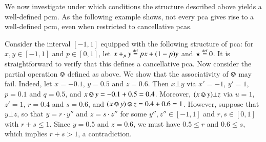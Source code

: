 We now investigate under which conditions the structure described above yields a well-defined pcm. As the following example shows, not every pca gives rise to a well-defined pcm, even when restricted to cancellative pcas.
\begin{example}
   Consider the interval $[-1,1]$ equipped with the following structure of pca: for $x,y\in [-1,1]$ and $p\in [0,1]$, let $x+_p y \stackrel{\text{\tiny def}}{=} p x + (1-p) y$ and $\star \stackrel{\text{\tiny def}}{=} 0$. It is straightforward to verify that this defines a cancellative pca. Now consider the partial operation $\circledvee$ defined as above. We show that the associativity of $\circledvee$ may fail. Indeed, let $x=-0.1$, $y=0.5$ and $z=0.6$. Then $x\bot y$ via $x'=-1$, $y'=1$, $p=0.1$ and $q=0.5$, and $x\circledvee y = -0.1 + 0.5 = 0.4$. Moreover, $(x\circledvee y)\bot z$ via $u=1$, $z'=1$, $r=0.4$ and $s=0.6$, and $(x\circledvee y)\circledvee z = 0.4 + 0.6 = 1$. However, suppose that $y\bot z$, so that $y = r\cdot y''$ and $z = s\cdot z''$ for some $y'',z''\in [-1,1]$ and $r,s\in [0,1]$ with $r+s\le 1$. Since $y=0.5$ and $z=0.6$, we must have $0.5 \le r$ and $0.6 \le s$, which implies $r+s > 1$, a contradiction.
\end{example}

